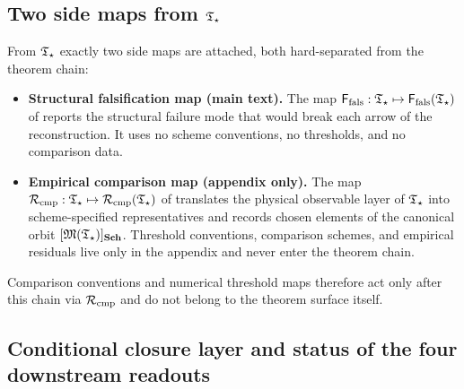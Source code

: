 \subsection{Two side maps from \texorpdfstring{$\mathfrak T_{\star}$}{T-star}}

From $\mathfrak T_{\star}$ exactly two side maps are attached, both hard-separated from the theorem chain:
\begin{itemize}[leftmargin=1.5em, topsep=3pt, itemsep=2pt]
    \item \textbf{Structural falsification map (main text).} The map
    $\mathsf F_{\mathrm{fals}}:\mathfrak T_{\star}\mapsto\mathsf F_{\mathrm{fals}}(\mathfrak T_{\star})$ of  reports the
    structural failure mode that would break each arrow of the reconstruction. It uses no
    scheme conventions, no thresholds, and no comparison data.
    \item \textbf{Empirical comparison map (appendix only).} The map
    $\mathcal R_{\mathrm{cmp}}:\mathfrak T_{\star}\mapsto\mathcal R_{\mathrm{cmp}}(\mathfrak T_{\star})$ of  translates the
    physical observable layer of $\mathfrak T_{\star}$ into scheme-specified representatives and records chosen
    elements of the canonical orbit $[\mathfrak M(\mathfrak T_{\star})]_{\mathbf{Sch}}$. Threshold conventions, comparison
    schemes, and empirical residuals live only in the appendix and never enter the theorem chain.
\end{itemize}
Comparison conventions and numerical threshold maps therefore act only after this chain via
$\mathcal R_{\mathrm{cmp}}$ and do not belong to the theorem surface itself.

\subsection{Conditional closure layer and status of the four downstream readouts}
\label{subsec:conditional-closure-status}

